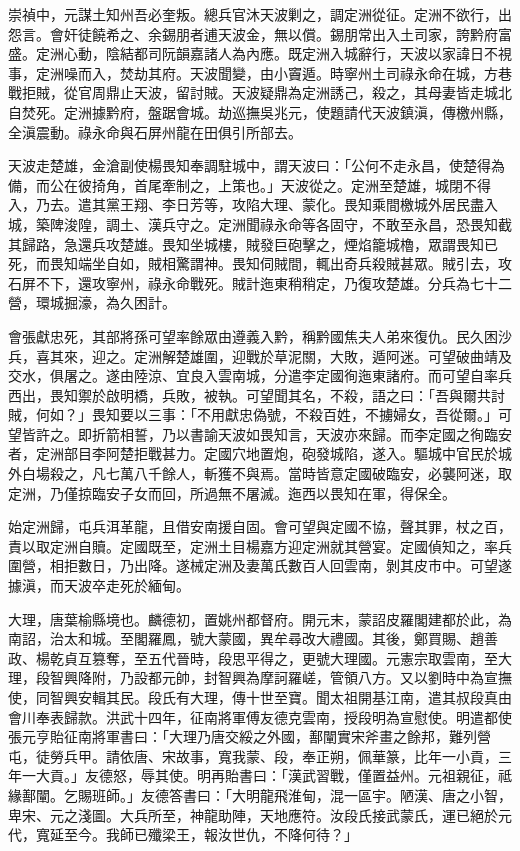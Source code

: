 \begin{pinyinscope}
崇禎中，元謀土知州吾必奎叛。總兵官沐天波剿之，調定洲從征。定洲不欲行，出怨言。會奸徒饒希之、余錫朋者逋天波金，無以償。錫朋常出入土司家，誇黔府富盛。定洲心動，陰結都司阮韻嘉諸人為內應。既定洲入城辭行，天波以家諱日不視事，定洲噪而入，焚劫其府。天波聞變，由小竇遁。時寧州土司祿永命在城，方巷戰拒賊，從官周鼎止天波，留討賊。天波疑鼎為定洲誘己，殺之，其母妻皆走城北自焚死。定洲據黔府，盤踞會城。劫巡撫吳兆元，使題請代天波鎮滇，傳檄州縣，全滇震動。祿永命與石屏州龍在田俱引所部去。

天波走楚雄，金滄副使楊畏知奉調駐城中，謂天波曰：「公何不走永昌，使楚得為備，而公在彼掎角，首尾牽制之，上策也。」天波從之。定洲至楚雄，城閉不得入，乃去。遣其黨王翔、李日芳等，攻陷大理、蒙化。畏知乘間檄城外居民盡入城，築陴浚隍，調土、漢兵守之。定洲聞祿永命等各固守，不敢至永昌，恐畏知截其歸路，急還兵攻楚雄。畏知坐城樓，賊發巨砲擊之，煙焰籠城櫓，眾謂畏知已死，而畏知端坐自如，賊相驚謂神。畏知伺賊間，輒出奇兵殺賊甚眾。賊引去，攻石屏不下，還攻寧州，祿永命戰死。賊計迤東稍稍定，乃復攻楚雄。分兵為七十二營，環城掘濠，為久困計。

會張獻忠死，其部將孫可望率餘眾由遵義入黔，稱黔國焦夫人弟來復仇。民久困沙兵，喜其來，迎之。定洲解楚雄圍，迎戰於草泥關，大敗，遁阿迷。可望破曲靖及交水，俱屠之。遂由陸涼、宜良入雲南城，分遣李定國徇迤東諸府。而可望自率兵西出，畏知禦於啟明橋，兵敗，被執。可望聞其名，不殺，語之曰：「吾與爾共討賊，何如？」畏知要以三事：「不用獻忠偽號，不殺百姓，不擄婦女，吾從爾。」可望皆許之。即折箭相誓，乃以書諭天波如畏知言，天波亦來歸。而李定國之徇臨安者，定洲部目李阿楚拒戰甚力。定國穴地置炮，砲發城陷，遂入。驅城中官民於城外白場殺之，凡七萬八千餘人，斬獲不與焉。當時皆意定國破臨安，必襲阿迷，取定洲，乃僅掠臨安子女而回，所過無不屠滅。迤西以畏知在軍，得保全。

始定洲歸，屯兵洱革龍，且借安南援自固。會可望與定國不協，聲其罪，杖之百，責以取定洲自贖。定國既至，定洲土目楊嘉方迎定洲就其營宴。定國偵知之，率兵圍營，相拒數日，乃出降。遂械定洲及妻萬氏數百人回雲南，剝其皮市中。可望遂據滇，而天波卒走死於緬甸。

大理，唐葉榆縣境也。麟德初，置姚州都督府。開元末，蒙詔皮羅閣建都於此，為南詔，治太和城。至閣羅鳳，號大蒙國，異牟尋改大禮國。其後，鄭買賜、趙善政、楊乾貞互篡奪，至五代晉時，段思平得之，更號大理國。元憲宗取雲南，至大理，段智興降附，乃設都元帥，封智興為摩訶羅嵯，管領八方。又以劉時中為宣撫使，同智興安輯其民。段氏有大理，傳十世至寶。聞太祖開基江南，遣其叔段真由會川奉表歸款。洪武十四年，征南將軍傅友德克雲南，授段明為宣慰使。明遣都使張元亨貽征南將軍書曰：「大理乃唐交綏之外國，鄯闡實宋斧畫之餘邦，難列營屯，徒勞兵甲。請依唐、宋故事，寬我蒙、段，奉正朔，佩華篆，比年一小貢，三年一大貢。」友德怒，辱其使。明再貽書曰：「漢武習戰，僅置益州。元祖親征，祗緣鄯闡。乞賜班師。」友德答書曰：「大明龍飛淮甸，混一區宇。陋漢、唐之小智，卑宋、元之淺圖。大兵所至，神龍助陣，天地應符。汝段氏接武蒙氏，運已絕於元代，寬延至今。我師已殲梁王，報汝世仇，不降何待？」


\end{pinyinscope}

